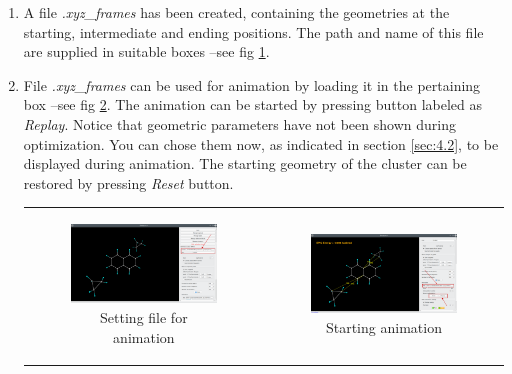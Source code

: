 \documentclass[10pt]{article}
\begin{document}
\begin{enumerate}
\item A file {\it *.xyz\_frames} has been created, containing the geometries
at the starting, intermediate and ending positions. The path and name 
of this file are supplied
in suitable boxes --see fig \ref{fig:A6_5}. 

\item File {\it *.xyz\_frames} can be used
for animation by loading it in the pertaining box --see fig \ref{fig:A6_6}.
The animation can be started by pressing button labeled as {\it Replay}.
Notice that geometric parameters have not been shown during optimization.
You can chose them now, as indicated in section \ref{sec:4.2}, to be displayed 
during animation. The starting geometry of the cluster can be restored by pressing
{\it Reset} button.

\begin{center}
\begin{tabular}{cc}
\begin{minipage}{.48\linewidth}
\begin{figure}[H]
\begin{center}
\includegraphics[width=.8\linewidth]{damqt320_epic_5_b.png}
\end{center}
\caption{{Setting file for animation} \label{fig:A6_5}}
\end{figure}
\end{minipage}
&
\begin{minipage}{.48\linewidth}
\begin{figure}[H]
\begin{center}
\includegraphics[width=.8\linewidth]{damqt320_epic_6_b.png}
\end{center}
\caption{{Starting animation}\label{fig:A6_6}}
\end{figure}
\end{minipage}
\end{tabular}
\end{center}


\end{enumerate}
\end{document}
